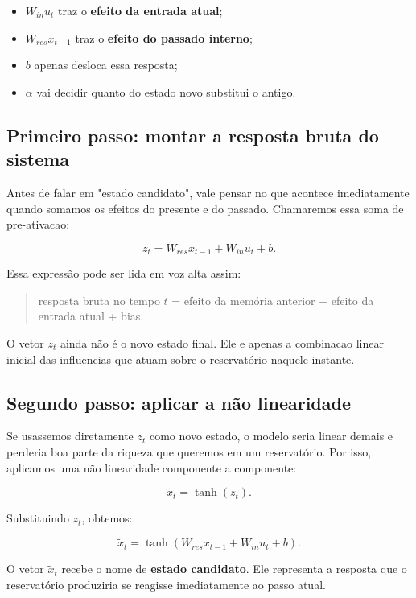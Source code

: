 \documentclass[12pt]{article}
\providecommand{\tightlist}{%
              \setlength{\itemsep}{0pt}\setlength{\parskip}{0pt}}
\begin{document}
\begin{itemize}
\tightlist
\item
  \(W_{in} u_t\) traz o \textbf{efeito da entrada atual};
\item
  \(W_{res} x_{t-1}\) traz o \textbf{efeito do passado interno};
\item
  \(b\) apenas desloca essa resposta;
\item
  \(\alpha\) vai decidir quanto do estado novo substitui o antigo.
\end{itemize}

\subsection{Primeiro passo: montar a resposta bruta do sistema}\label{33-primeiro-passo-montar-a-resposta-bruta-do-sistema}

Antes de falar em "estado candidato", vale pensar no que acontece imediatamente quando somamos os efeitos do presente e do passado. Chamaremos essa soma de pre-ativacao:

\[
z_t = W_{res} x_{t-1} + W_{in} u_t + b.
\]

Essa expressão pode ser lida em voz alta assim:

\begin{quote}
resposta bruta no tempo \(t\) = efeito da memória anterior + efeito da entrada atual + bias.
\end{quote}

O vetor \(z_t\) ainda não é o novo estado final. Ele e apenas a combinacao linear inicial das influencias que atuam sobre o reservatório naquele instante.

\subsection{Segundo passo: aplicar a não linearidade}\label{34-segundo-passo-aplicar-a-nuxe3o-linearidade}

Se usassemos diretamente \(z_t\) como novo estado, o modelo seria linear demais e perderia boa parte da riqueza que queremos em um reservatório. Por isso, aplicamos uma não linearidade componente a componente:

\[
\widetilde{x}_t = \tanh(z_t).
\]

Substituindo \(z_t\), obtemos:

\[
\widetilde{x}_t = \tanh(W_{res} x_{t-1} + W_{in} u_t + b).
\]

O vetor \(\widetilde{x}_t\) recebe o nome de \textbf{estado candidato}. Ele representa a resposta que o reservatório produziria se reagisse imediatamente ao passo atual.
\end{document}
